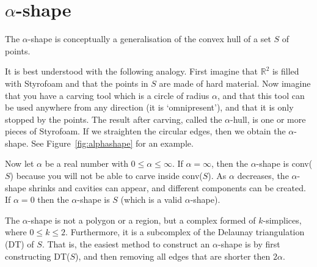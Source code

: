 %
\section{$\alpha$-shape}

The $\alpha$-shape is conceptually a generalisation of the convex hull of a set $S$ of points.

%

It is best understood with the following analogy.
First imagine that $\mathbb{R}^2$ is filled with Styrofoam and that the points in $S$ are made of hard material.
Now imagine that you have a carving tool which is a circle of radius $\alpha$, and that this tool can be used anywhere from any direction (it is `omnipresent'), and that it is only stopped by the points.
The result after carving, called the $\alpha$-hull, is one or more pieces of Styrofoam.
If we straighten the circular edges, then we obtain the $\alpha$-shape.
See Figure~\ref{fig:alphashape} for an example.
%

Now let $\alpha$ be a real number with $0 \leq \alpha \leq \infty$.
If $\alpha = \infty$, then the $\alpha$-shape is conv($S$) because you will not be able to carve inside conv($S$).
As $\alpha$ decreases, the $\alpha$-shape shrinks and cavities can appear, and different components can be created.
If $\alpha = 0$ then the $\alpha$-shape is $S$ (which is a valid $\alpha$-shape).

%

The $\alpha$-shape is not a polygon or a region, but a complex formed of $k$-simplices, where $0 \leq k \leq 2$.
Furthermore, it is a subcomplex of the Delaunay triangulation (DT) of $S$.
That is, the easiest method to construct an $\alpha$-shape is by first constructing DT($S$), and then removing all edges that are shorter then $2\alpha$.


